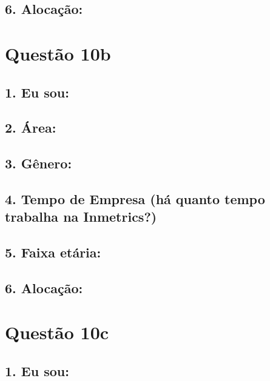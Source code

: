 \documentclass[]{book}
\begin{document}
\hypertarget{alocacao-8}{%
\subsection{6. Alocação:}\label{alocacao-8}}

\hypertarget{questao-10b}{%
\section{Questão 10b}\label{questao-10b}}

\hypertarget{eu-sou-9}{%
\subsection{1. Eu sou:}\label{eu-sou-9}}

\hypertarget{area-9}{%
\subsection{2. Área:}\label{area-9}}

\hypertarget{genero-9}{%
\subsection{3. Gênero:}\label{genero-9}}

\hypertarget{tempo-de-empresa-ha-quanto-tempo-trabalha-na-inmetrics-9}{%
\subsection{4. Tempo de Empresa (há quanto tempo trabalha na Inmetrics?)}\label{tempo-de-empresa-ha-quanto-tempo-trabalha-na-inmetrics-9}}

\hypertarget{faixa-etaria-9}{%
\subsection{5. Faixa etária:}\label{faixa-etaria-9}}

\hypertarget{alocacao-9}{%
\subsection{6. Alocação:}\label{alocacao-9}}

\hypertarget{questao-10c}{%
\section{Questão 10c}\label{questao-10c}}

\hypertarget{eu-sou-10}{%
\subsection{1. Eu sou:}\label{eu-sou-10}}
\end{document}
